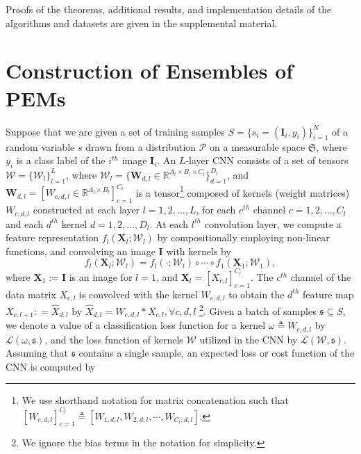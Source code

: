 \documentclass[10pt,journal,compsoc]{IEEEtran}
\theoremstyle{definition}
\theoremstyle{definition}
\theoremstyle{remark}
\theoremstyle{remark}
\theoremstyle{remark}
\begin{document}
Proofs of the theorems, additional results, and implementation details of the algorithms and datasets are given in the supplemental material.

\section{Construction of Ensembles of PEMs}
\label{sec2}

Suppose that we are given a set of training samples ${S=\{s_i= (\mathbf{I}_i,y_i) \}_{i=1}^N}$ of a random variable $s$ drawn from a distribution $\mathcal{P}$ on a measurable space $\mathfrak{S}$, where $y_i $ is a class label of the $i^{th}$ image $\mathbf{I}_i$. An $L$-layer CNN consists of a set of tensors $\mathcal{W} = \{\mathcal{W}_l \}_{l=1}^L$, where ${\mathcal{W}_l = \{ \mathbf{W}_{d,l} \in \mathbb{R}^{A_l \times B_l \times C_l} \} _{d=1} ^{D_l}}$, and ${\mathbf{W}_{d,l} = [W_{c,d,l} \in \mathbb{R}^{A_l \times B_l}]_{c=1}^{C_l}}$  is a tensor\footnote{We use shorthand notation for matrix concatenation such that $[W_{c,d,l}  ]_{c=1}^{C_l} \triangleq [W_{1,d,l}, W_{2,d,l}, \cdots,W_{C_l,d,l}]$.} composed of kernels (weight matrices) $W_{c,d,l} $ constructed at each layer ${l=1,2,\ldots,L}$, for each $c^{th}$ channel $c=1,2,\ldots,C_l$ and each $d^{th}$ kernel $d=1,2,\ldots,D_l$. At each $l^{th}$ convolution layer, we compute a feature representation $f_l(\mathbf{X}_l;\mathcal{W}_l)$ by compositionally employing non-linear functions, and convolving an image $\mathbf{I}$ with kernels by  
\begin{equation}
f_l(\mathbf{X}_l;\mathcal{W}_{l}) = f_l(\cdot;\mathcal{W}_l) \circ  \cdots \circ f_1(\mathbf{X}_1;\mathcal{W}_{1}),
\label{eq:comp_rep}
\end{equation}
where ${\mathbf{X}_1 := \mathbf{I}}$ is an image for ${l=1}$, and $\mathbf{X}_{l} = [ X_{c,l}]_{c=1}^{C_l}$. The $c^{th}$ channel of the data matrix $X_{c,l}$ is convolved with the kernel ${W}_{c,d,l}$ to obtain the $d^{th}$ feature map ${ X_{c,l+1} : = \hat{X}_{d,l}}$ by $\hat{X}_{d,l} = {W}_{c,d,l} \ast X_{c,l}, \forall c, d, l$ \footnote{We ignore the bias terms in the notation for simplicity.}. Given a batch of samples $\mathfrak{s} \subseteq S$, we denote a value of a classification loss function for a kernel $\omega \triangleq W_{c,d,l}$ by $\mathcal{L}(\omega,\mathfrak{s})$, and the loss function of kernels $\mathcal{W}$ utilized in the CNN by $\mathcal{L}(\mathcal{W},\mathfrak{s})$. Assuming that  $\mathfrak{s}$ contains a single sample, an expected loss or cost function of the CNN  is computed by
\end{document}
